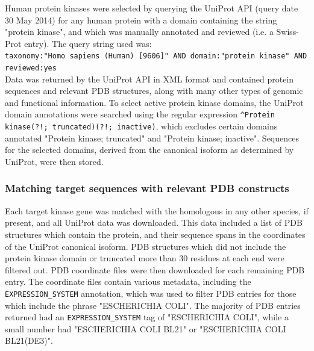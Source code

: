 \documentclass[phd,tocprelim]{cornell}
\begin{document}
Human protein kinases were selected by querying the UniProt API (query date 30 May 2014) for any human protein with a domain containing the string "protein kinase", and which was manually annotated and reviewed (i.e. a Swiss-Prot entry).
The query string used was:\\
{\tt taxonomy:"Homo sapiens (Human) [9606]" AND domain:"protein kinase" AND reviewed:yes}\\
Data was returned by the UniProt API in XML format and contained protein sequences and relevant PDB structures, along with many other types of genomic and functional information.
To select active protein kinase domains, the UniProt domain annotations were searched using the regular expression {\tt \^{}Protein kinase(?!; truncated)(?!; inactive)}, which excludes certain domains annotated "Protein kinase; truncated" and "Protein kinase; inactive".
Sequences for the selected domains, derived from the canonical isoform as determined by UniProt, were then stored.


\subsubsection{Matching target sequences with relevant PDB constructs}

Each target kinase gene was matched with the homologous in any other species, if present, and all UniProt data was downloaded.
This data included a list of PDB structures which contain the protein, and their sequence spans in the coordinates of the UniProt canonical isoform. PDB structures which did not include the protein kinase domain or truncated more than 30 residues at each end were filtered out. PDB coordinate files were then downloaded for each remaining PDB entry. The coordinate files contain various metadata, including the {\tt EXPRESSION\_SYSTEM} annotation, which was used to filter PDB entries for those which include the phrase "ESCHERICHIA COLI". The majority of PDB entries returned had an {\tt EXPRESSION\_SYSTEM} tag of "ESCHERICHIA COLI", while a small number had "ESCHERICHIA COLI BL21" or "ESCHERICHIA COLI BL21(DE3)".
\end{document}

